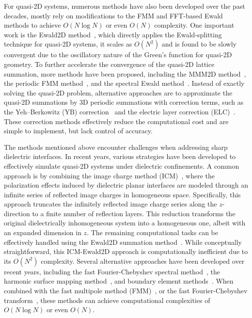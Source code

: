 For quasi-2D systems,  numerous methods have also been developed over the past decades, mostly rely on modifications to the FMM and FFT-based Ewald methods to achieve $O(N\log N)$ or even $O(N)$ complexity.
One important work is the Ewald2D method~\cite{parry1975electrostatic}, which directly applies the Ewald-splitting technique for quasi-2D systems, it scales as $O(N^2)$ and is found to be slowly convergent due to the oscillatory nature of the Green's function for quasi-2D geometry.
To further accelerate the convergence of the quasi-2D lattice summation, more methods have been proposed, including the MMM2D method~\cite{arnold2002mmm2d}, the periodic FMM method~\cite{yan2018flexibly}, and the spectral Ewald method~\cite{lindbo2012fast}.
Instead of exactly solving the quasi-2D problem, alternative approaches are to approximate the quasi-2D summations by 3D periodic summations with correction terms, such as the Yeh--Berkowitz (YB) correction~\cite{yeh1999ewald} and the  {electric layer correction (ELC)~\cite{arnold2002electrostatics}.}
These correction methods effectively reduce the computational cost and are simple to implement, but lack control of accuracy.

The methods mentioned above encounter challenges when addressing sharp dielectric interfaces. In recent years, various strategies have been developed to effectively simulate quasi-2D systems under dielectric confinements.
A common approach is by combining the image charge method (ICM)~\cite{jackson1999classical,frenkel2023understanding}, where the polarization effects induced by dielectric planar interfaces are modeled through an infinite series of reflected image charges in homogeneous space.
Specifically, this approach truncates the infinitely reflected image charge series along the $z$-direction to a finite number of reflection layers. 
This reduction transforms the original dielectrically inhomogeneous system into a homogeneous one, albeit with an expanded dimension in $z$.
The remaining computational tasks can be effectively handled using the Ewald2D summation method~\cite{parry1975electrostatic,zhonghanhu2014JCTC}. While conceptually straightforward, this ICM-Ewald2D approach is computationally inefficient due to its $O(N^2)$ complexity.
Several alternative approaches have been developed over recent years, including the fast Fourier-Chebyshev spectral method~\cite{maxian2021fast,gao2024fast}, the harmonic surface mapping method~\cite{liang2020harmonic,liang2022hsma}, and boundary element methods~\cite{barros2014efficient,nguyen2019incorporating}.
When combined with the fast multipole method (FMM)~\cite{greengard1987fast,kohnke2020gpu}, or the fast Fourier-Chebyshev transform~\cite{trefethen2000spectral}, these methods can achieve computational complexities of $ O(N\log N)$ or even $ O(N)$.

